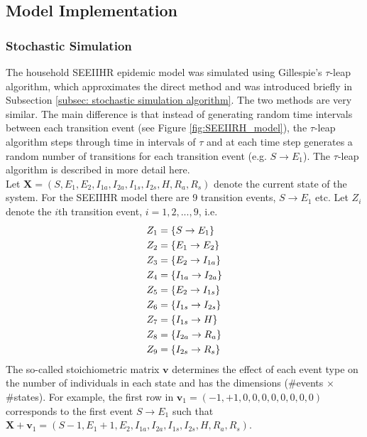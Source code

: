 \subsection{Model Implementation}

\subsubsection{Stochastic Simulation}
The household SEEIIHR epidemic model was simulated using Gillespie's $\tau$-leap algorithm, which approximates the direct method and was introduced briefly in Subsection \ref{subsec: stochastic simulation algorithm}. The two methods are very similar. The main difference is that instead of generating random time intervals between each transition event (see Figure \ref{fig:SEEIIRH_model}), the $\tau$-leap algorithm steps through time in intervals of $\tau$ and at each time step generates a random number of transitions for each transition event (e.g. $S\rightarrow E_1$). The $\tau$-leap algorithm is described in more detail here.\\
Let $\mathbf{X}=(S, E_1, E_2, I_{1a}, I_{2a}, I_{1s}, I_{2s}, H, R_a, R_s)$ denote the current state of the system. For the SEEIIHR model there are 9 transition events, $S \rightarrow E_1$ etc. Let $Z_{i}$ denote the $i$th transition event, $i=1,2,...,9$, i.e.
\begin{align} \notag
	Z_1 &= \{S \rightarrow E_1 \} \\ \notag
	Z_2 &= \{E_1 \rightarrow E_2 \} \\ \notag
	Z_3 &= \{E_2 \rightarrow I_{1a} \} \\ \notag
	Z_4 &= \{I_{1a} \rightarrow I_{2a} \} \\ \notag
	Z_5 &= \{E_2 \rightarrow I_{1s} \} \\ \notag
	Z_6 &= \{I_{1s} \rightarrow I_{2s} \} \\ \notag
	Z_7 &= \{I_{1s} \rightarrow H \} \\ \notag
	Z_8 &= \{I_{2a} \rightarrow R_a \} \\ \notag
	Z_9 &= \{I_{2s} \rightarrow R_s \}
\end{align}
The so-called stoichiometric matrix $\mathbf{v}$ determines the effect of each event type on the number of individuals in each state and has the dimensions (\#events $\times$ \#states). For example, the first row in $\mathbf{v}_1 = (-1, +1, 0, 0, 0, 0, 0, 0, 0, 0)$ corresponds to the first event $S \rightarrow E_1$ such that $\mathbf{X} + \mathbf{v}_{1} = (S-1, E_1+1, E_2, I_{1a}, I_{2a}, I_{1s}, I_{2s}, H, R_a, R_s)$.
